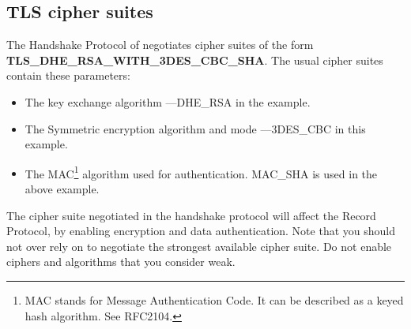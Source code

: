 \subsection{TLS cipher suites}
\par 
The Handshake Protocol of \tlsI{} negotiates cipher suites 
of the form \\
{\bf TLS\_DHE\_RSA\_WITH\_3DES\_CBC\_SHA}.
The usual cipher suites contain these parameters:
\begin{itemize}
\item The key exchange algorithm ---DHE\_RSA in the example.
\item The Symmetric encryption algorithm and mode ---3DES\_CBC in this
example.
\item The MAC\footnote{MAC stands for Message Authentication Code. It can
be described as a keyed hash algorithm. See RFC2104.} algorithm used for authentication.
MAC\_SHA is used in the above example.
\end{itemize}

The cipher suite negotiated in the handshake protocol will affect
the Record Protocol, by enabling encryption and data authentication.
Note that you should not over rely on \tls{} to negotiate the strongest 
available cipher suite. Do not enable
ciphers and algorithms that you consider weak.

\addvspace{1.5cm}
